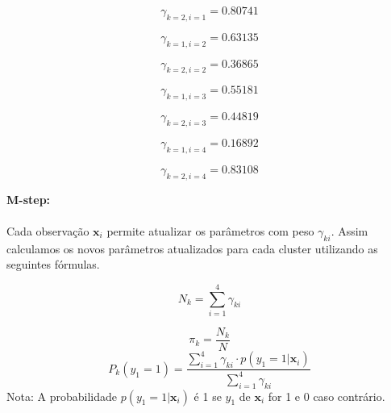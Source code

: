 \documentclass[a4paper,12pt]{article} %
\begin{document}
\begin{enumerate}
\begin{equation*}
    \gamma_{k=2,i=1} = 0.80741
\end{equation*}

\begin{equation*}
    \gamma_{k=1,i=2} = 0.63135
\end{equation*}

\begin{equation*}
    \gamma_{k=2,i=2} = 0.36865
\end{equation*}

\begin{equation*}
    \gamma_{k=1,i=3} = 0.55181
\end{equation*}

\begin{equation*}
    \gamma_{k=2,i=3} = 0.44819
\end{equation*}

\begin{equation*}
    \gamma_{k=1,i=4} = 0.16892
\end{equation*}

\begin{equation*}
    \gamma_{k=2,i=4} = 0.83108
\end{equation*}

\textbf{M-step:} \\ \\
Cada observação $\mathbf{x}_i$ permite atualizar os parâmetros com peso $\gamma_{ki}$. 
Assim calculamos os novos parâmetros atualizados para cada cluster utilizando as seguintes fórmulas. 

\begin{equation}
    N_k = \sum_{i=1}^4 \gamma_{ki}
\end{equation}

\begin{equation}
    \pi_k = \frac{N_k}{N}
\end{equation}
\begin{equation}
    P_k(y_1=1) = \frac{\sum_{i=1}^4 \gamma_{ki} \cdot p(y_1=1|\mathbf{x}_i)}{\sum_{i=1}^4 \gamma_{ki}} 
\end{equation}
Nota: A probabilidade $p(y_1=1|\mathbf{x}_i)$ é 1 se $y_1$ de $\mathbf{x}_i$ for 1 e 0 caso contrário. 


\end{enumerate}
\end{document}
